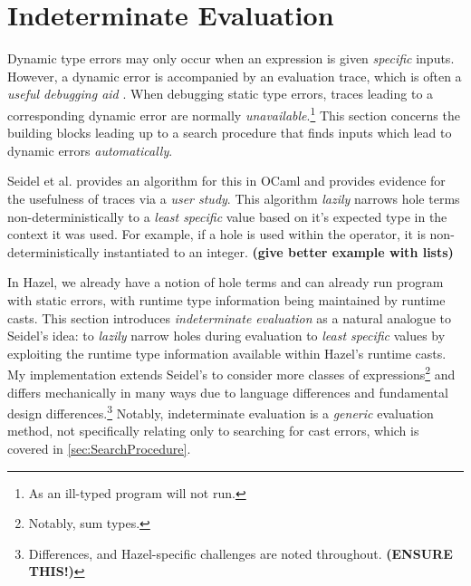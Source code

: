 \section{Indeterminate Evaluation}\label{sec:IndetEval}
Dynamic type errors may only occur when an expression is given \textit{specific} inputs. However, a dynamic error is accompanied by an evaluation trace, which is often a \textit{useful debugging aid} \cite{TraceVisualisation}. When debugging static type errors, traces leading to a corresponding dynamic error are normally \textit{unavailable}.\footnote{As an ill-typed program will not run.} This section concerns the building blocks leading up to a search procedure that finds inputs which lead to dynamic errors \textit{automatically}.

Seidel et al. \cite{SearchProc} provides an algorithm for this in OCaml and provides evidence for the usefulness of traces via a \textit{user study}. This algorithm \textit{lazily} narrows hole terms non-deterministically to a \textit{least specific} value based on it's expected type in the context it was used. For example, if a hole is used within the \code{(+)} operator, it is non-deterministically instantiated to an integer. \textbf{(give better example with lists)}

In Hazel, we already have a notion of hole terms and can already run program with static errors, with runtime type information being maintained by runtime casts. This section introduces \textit{indeterminate evaluation} as a natural analogue to Seidel's idea: to \textit{lazily} narrow holes during evaluation to \textit{least specific} values by exploiting the runtime type information available within Hazel's runtime casts. My implementation extends Seidel's to consider more classes of expressions\footnote{Notably, sum types.} and differs mechanically in many ways due to language differences and fundamental design differences.\footnote{Differences, and Hazel-specific challenges are noted throughout. \textbf{(ENSURE THIS!)}} Notably, indeterminate evaluation is a \textit{generic} evaluation method, not specifically relating only to searching for cast errors, which is covered in \cref{sec:SearchProcedure}.

